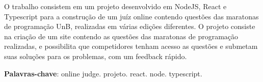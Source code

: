 \begin{resumo}

    O trabalho consistem em um projeto desenvolvido em NodeJS, React e Typescript
    para a construção de um juíz online contendo questões das maratonas de programação UnB,
    realizadas em várias edições diferentes. O projeto consiste na criação de um site contendo 
    as questões das maratonas de programação realizadas, e possibilita que competidores tenham 
    acesso as questões e submetam suas soluções para os problemas, com um feedback rápido.

 \vspace{\onelineskip}
    
 \noindent
 \textbf{Palavras-chave}: online judge. projeto. react. node. typescript.
\end{resumo}
